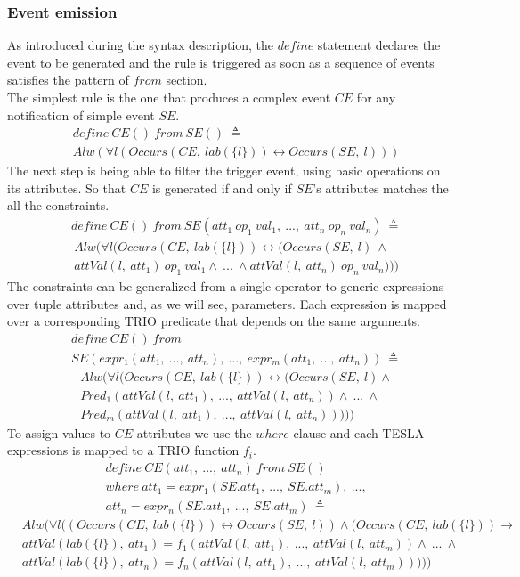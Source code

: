 \subsubsection{Event emission}
As introduced during the syntax description, the $define$ statement declares the event to be generated and the rule is triggered as soon as a sequence of events satisfies the pattern of $from$ section.\\
The simplest rule is the one that produces a complex event $CE$ for any notification of simple event $SE$.
\begin{align*}
&define\ CE()\ from\ SE()\ \triangleq\\
&Alw(\forall l(Occurs(CE,\ lab(\{l\})) \leftrightarrow Occurs(SE,\ l)))
\end{align*}
The next step is being able to filter the trigger event, using basic operations on its attributes. So that $CE$ is generated if and only if $SE$'s attributes matches the all the constraints.
\begin{align*}
&define\ CE()\ from\ SE(att_1\ op_1\ val_1,\ ...,\ att_n\ op_n\ val_n)\ \triangleq
\end{align*}
\begin{align*}
&Alw(\forall l(Occurs(CE,\ lab(\{l\})) \leftrightarrow (Occurs(SE,\ l)\ \wedge\\
&attVal(l,\ att_1)\ op_1\ val_1 \wedge\ ...\ \wedge attVal(l,\ att_n)\ op_n\ val_n)))
\end{align*}
The constraints can be generalized from a single operator to generic expressions over tuple attributes and, as we will see, parameters. Each expression is mapped over a corresponding TRIO predicate that depends on the same arguments.
\begin{align*}
&define\ CE()\ from\\
&SE(expr_1(att_1,\ ...,\ att_n),\ ...,\ expr_m(att_1,\ ...,\ att_n))\ \triangleq
\end{align*}
\begin{align*}
&Alw(\forall l (Occurs(CE,\ lab(\{l\})) \leftrightarrow (Occurs(SE,\ l) \wedge\\
&Pred_1(attVal(l,\ att_1),\ ...,\ attVal(l,\ att_n)) \wedge\ ...\ \wedge\\
&Pred_m(attVal(l,\ att_1),\ ...,\ attVal(l,\ att_n)))))
\end{align*}
To assign values to $CE$ attributes we use the $where$ clause and each TESLA expressions is mapped to a TRIO function $f_i$.
\begin{align*}
&define\ CE(att_1,\ ...,\ att_n)\ from\ SE()\\
&where\ att_1 = expr_1(SE.att_1,\ ...,\ SE.att_m),\ ...,\\
&att_n = expr_n(SE.att_1,\ ...,\ SE.att_m)\ \triangleq
\end{align*}
\begin{align*}
&Alw(\forall l ((Occurs(CE,\ lab(\{l\})) \leftrightarrow Occurs(SE,\ l)) \wedge (Occurs(CE,\ lab(\{l\})) \rightarrow\\
&attVal(lab(\{l\}),\ att_1) = f_1(attVal(l,\ att_1),\ ...,\ attVal(l,\ att_m)) \wedge\ ...\ \wedge\\
&attVal(lab(\{l\}),\ att_n) = f_n(attVal(l,\ att_1),\ ...,\ attVal(l,\ att_m)))))
\end{align*}

